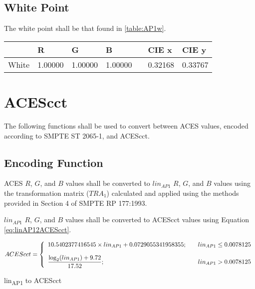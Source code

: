 \subsection{White Point}
The white point shall be that found in \autoref{table:AP1w}.

\begin{center}
\begin{tabularx}{4.5in}{XlllXll}
        & R       & G       & B       & & CIE x & CIE y \\ \hline
White   & 1.00000 & 1.00000 & 1.00000 & & 0.32168 & 0.33767 \\
\end{tabularx}
\label{table:AP1w}
\end{center}

\newpage
\section{ACEScct}
\label{sec:ACEScct}
The following functions shall be used to convert between ACES values, encoded according to SMPTE ST 2065-1, and ACEScct.

\subsection{Encoding Function}
ACES $R$, $G$, and $B$ values shall be converted to $lin_{AP1}$ $R$, $G$, and $B$ values using the transformation matrix ($TRA_{1}$) calculated and applied using the methods provided in Section 4 of SMPTE RP 177:1993.

$lin_{AP1}$ $R$, $G$, and $B$ values shall be converted to ACEScct values using Equation \ref{eq:linAP12ACEScct}.

\begin{floatequ} 
\begin{equation} 
    ACEScct = \left\{ 
    \begin{array}{l l }
        10.5402377416545 \times lin_{AP1} + 0.0729055341958355;    & \quad lin_{AP1} \leq 0.0078125 \\[10pt]
        \dfrac{\log_{2}(lin_{AP1}) + 9.72}{17.52}; & \quad lin_{AP1} > 0.0078125 \\    
    \end{array} \right.
\end{equation}
\caption{lin\textsubscript{AP1} to ACEScct}
\label{eq:linAP12ACEScct}
\end{floatequ}


